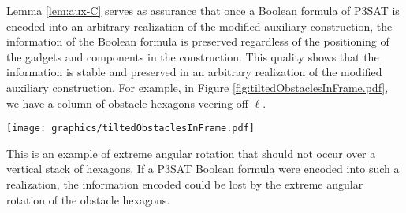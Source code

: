 \documentclass[10pt]{CSUNthesis}
\theoremstyle{plain}%
\theoremstyle{definition}
\theoremstyle{remark}
\begin{document}
Lemma \ref{lem:aux-C} serves as assurance that once a Boolean formula of P3SAT is encoded into an arbitrary realization of the modified auxiliary construction, the information of the Boolean formula is preserved regardless of the positioning of the gadgets and components in the construction.
This quality shows that the information is stable and preserved in an arbitrary realization of the modified auxiliary construction.
For example, in Figure \ref{fig:tiltedObstaclesInFrame.pdf}, we have a column of obstacle hexagons veering off $\ell$.

\begin{minipage}{\linewidth}
\begin{center}
\texttt{[image: graphics/tiltedObstaclesInFrame.pdf]}
\label{fig:tiltedObstaclesInFrame.pdf}
\end{center}
\end{minipage}

This is an example of extreme angular rotation that should not occur over a vertical stack of hexagons. 
If a P3SAT Boolean formula were encoded into such a realization, the information encoded could be lost by the extreme angular rotation of the obstacle hexagons.
\end{document}
